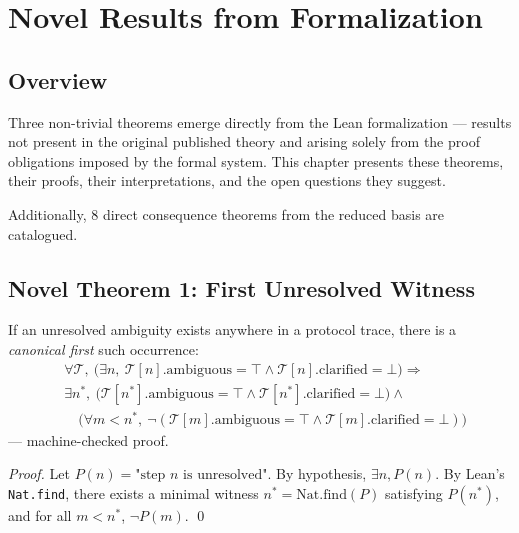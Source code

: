 \section{Novel Results from Formalization}
\label{ch:results}

\subsection{Overview}

Three non-trivial theorems emerge directly from the Lean formalization --- results
not present in the original published theory and arising solely from the proof
obligations imposed by the formal system. This chapter presents these theorems,
their proofs, their interpretations, and the open questions they suggest.

Additionally, 8 direct consequence theorems from the reduced basis are catalogued.

\subsection{Novel Theorem 1: First Unresolved Witness}

\begin{theorem}
If an unresolved ambiguity exists anywhere in a protocol trace, there is a
\emph{canonical first} such occurrence:
\begin{align*}
  &\forall \mathcal{T},\
  \Big(\exists n,\
  \mathcal{T}[n].\mathrm{ambiguous} = \top
  \wedge \mathcal{T}[n].\mathrm{clarified} = \bot\Big)
  \Rightarrow \\
  &\exists n^*,\
  \Big(\mathcal{T}[n^*].\mathrm{ambiguous} = \top
  \wedge \mathcal{T}[n^*].\mathrm{clarified} = \bot\Big)
  \wedge \\
  &\quad \Big(\forall m < n^*,\
  \neg(\mathcal{T}[m].\mathrm{ambiguous} = \top
      \wedge \mathcal{T}[m].\mathrm{clarified} = \bot)\Big)
\end{align*}
--- machine-checked proof.
\end{theorem}
\begin{proof}
Let $P(n) = \text{"step } n \text{ is unresolved"}$. By hypothesis, $\exists n,
P(n)$. By Lean's \texttt{Nat.find}, there exists a minimal witness $n^* =
\mathrm{Nat.find}(P)$ satisfying $P(n^*)$, and for all $m < n^*$, $\neg P(m)$.
\qed
\end{proof}

